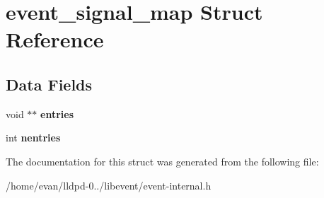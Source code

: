 \section{event\-\_\-signal\-\_\-map \-Struct \-Reference}
\label{structevent__signal__map}
\subsection*{\-Data \-Fields}
\begin{DoxyCompactItemize}
\item 
void $\ast$$\ast$ {\bfseries entries}\label{structevent__signal__map_a38612d243b7de0c5113e06195923da3a}

\item 
int {\bfseries nentries}\label{structevent__signal__map_a3a75b2f78441699f9deb4f71637293a5}

\end{DoxyCompactItemize}


\-The documentation for this struct was generated from the following file\-:\begin{DoxyCompactItemize}
\item 
/home/evan/lldpd-\/0../libevent/event-\/internal.\-h\end{DoxyCompactItemize}
